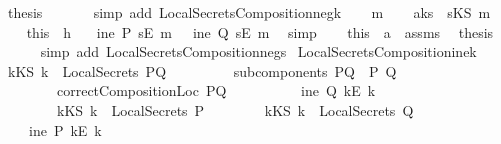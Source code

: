 \begin{isabellebody}
\ {\isacharquery}thesis\ \isanewline
\ \ \ \ \isamarkupfalse%
\ {\isacharparenleft}simp\ add{\isacharcolon}\ LocalSecretsComposition{\isacharunderscore}neg{}{\isacharunderscore}k{\isacharparenright}\isanewline
{}\isamarkupfalse%
\isanewline
\ \ \isamarkupfalse%
\ m\isanewline
\ \ \isamarkupfalse%
\ a{}{\isacharcolon}{\isachardoublequoteopen}ks\ {\isacharequal}\ sKS\ m{\isachardoublequoteclose}\isanewline
\ \ \isamarkupfalse%
\ this\ \ h{}\ \isamarkupfalse%
\ {\isachardoublequoteopen}{\isasymnot}\ ine\ P\ {\isacharparenleft}sE\ m{\isacharparenright}\ {\isasymand}\ {\isasymnot}\ ine\ Q\ {\isacharparenleft}sE\ m{\isacharparenright}{\isachardoublequoteclose}\ \isamarkupfalse%
\ simp\isanewline
\ \ \isamarkupfalse%
\ this\ \ a{}\ \ assms\ \isamarkupfalse%
\ {\isacharquery}thesis\ \isanewline
\ \ \ \ \isamarkupfalse%
\ {\isacharparenleft}simp\ add{\isacharcolon}\ LocalSecretsComposition{\isacharunderscore}neg{}{\isacharunderscore}s{\isacharparenright}\isanewline
{}\isamarkupfalse%
%
\endisatagproof
{\isafoldproof}%
%
\isadelimproof
\isanewline
%
\endisadelimproof
\isanewline
{}\isamarkupfalse%
\ LocalSecretsComposition{\isacharunderscore}ine{}{\isacharunderscore}k{\isacharcolon}\isanewline
{}\ {\isachardoublequoteopen}kKS\ k\ {\isasymin}\ LocalSecrets\ PQ{\isachardoublequoteclose}\ \isanewline
\ \ \ \ \ \ \ \ {\isachardoublequoteopen}subcomponents\ PQ\ {\isacharequal}\ {\isacharbraceleft}P{\isacharcomma}\ Q{\isacharbraceright}{\isachardoublequoteclose}\isanewline
\ \ \ \ \ \ \ \ {\isachardoublequoteopen}correctCompositionLoc\ PQ{\isachardoublequoteclose}\ \isanewline
\ \ \ \ \ \ \ \ {\isachardoublequoteopen}{\isasymnot}\ ine\ Q\ {\isacharparenleft}kE\ k{\isacharparenright}{\isachardoublequoteclose}\isanewline
\ \ \ \ \ \ \ \ {\isachardoublequoteopen}kKS\ k\ {\isasymnotin}\ LocalSecrets\ P{\isachardoublequoteclose}\isanewline
\ \ \ \ \ \ \ \ {\isachardoublequoteopen}kKS\ k\ {\isasymnotin}\ LocalSecrets\ Q{\isachardoublequoteclose}\isanewline
{}\ \ \ \ {\isachardoublequoteopen}ine\ P\ {\isacharparenleft}kE\ k{\isacharparenright}{\isachardoublequoteclose}\isanewline
%
\isadelimproof
%
\endisadelimproof
%
\isatagproof
{}\isamarkupfalse%

\end{isabellebody}
